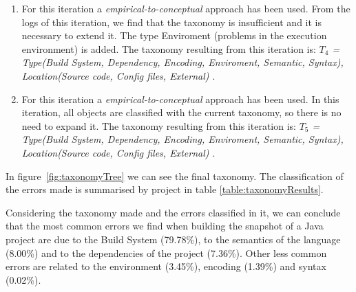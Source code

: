 \begin{enumerate}
	\vspace{2mm}
	\item For this iteration a \textit{empirical-to-conceptual} approach has been used. From the logs of this iteration, we find that the taxonomy is insufficient and it is necessary to extend it. The type Enviroment (problems in the execution environment) is added. The taxonomy resulting from this iteration is: \textit{$T_{4}$ = {Type(Build System, Dependency, Encoding, Enviroment, Semantic, Syntax), Location(Source code, Config files, External) }}.
	
	\vspace{2mm}
	\item For this iteration a \textit{empirical-to-conceptual} approach has been used. In this iteration, all objects are classified with the current taxonomy, so there is no need to expand it. The taxonomy resulting from this iteration is: \textit{$T_{5}$ = {Type(Build System, Dependency, Encoding, Enviroment, Semantic, Syntax), Location(Source code, Config files, External) }}.
\end{enumerate}          

In figure~\ref{fig:taxonomyTree} we can see the final taxonomy. The classification of the errors made is summarised by project in table \ref{table:taxonomyResults}.




\vspace{0.3cm}
\begin{tcolorbox}[fonttitle=\bfseries,title=Answer to RQ2: What are the most common problems that cause
	snapshot build fail?,label=rq2,colframe=blue!50!black]
	Considering the taxonomy made and the errors classified in it, we can conclude that the most common errors we find when building the snapshot of a Java project are due to the Build System (79.78\%), to the semantics of the language (8.00\%) and to the dependencies of the project (7.36\%). Other less common errors are related to the environment (3.45\%), encoding (1.39\%) and syntax (0.02\%).
\end{tcolorbox}
